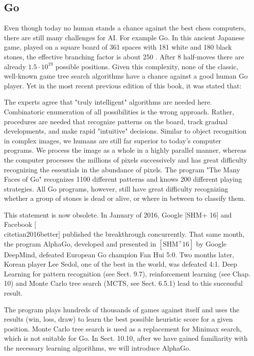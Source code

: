 \documentclass[10pt]{book}
\begin{document}
\subsection{Go}
Even though today no human stands a chance against the best chess computers, there are still many challenges for AI. For example Go. In this ancient Japanese game, played on a square board of 361 spaces with 181 white and 180 black stones, the effective branching factor is about 250 . After 8 half-moves there are already $1.5 \cdot 10^{19}$ possible positions. Given this complexity, none of the classic, well-known game tree search algorithms have a chance against a good human Go player. Yet in the most recent previous edition of this book, it was stated that:

\begin{displayquote}
The experts agree that "truly intelligent" algorithms are needed here. Combinatoric enumeration of all possibilities is the wrong approach. Rather, procedures are needed that recognize patterns on the board, track gradual developments, and make rapid "intuitive" decisions. Similar to object recognition in complex images, we humans are still far superior to today's computer programs. We process the image as a whole in a highly parallel manner, whereas the computer processes the millions of pixels successively and has great difficulty recognizing the essentials in the abundance of pixels. The program "The Many Faces of Go" recognizes 1100 different patterns and knows 200 different playing strategies. All Go programs, however, still have great difficulty recognizing whether a group of stones is dead or alive, or where in between to classify them.
\end{displayquote}

This statement is now obsolete. In January of 2016, Google [SHM+ 16] and Facebook [\\cite{tian2016better}] published the breakthrough concurrently. That same month, the program AlphaGo, developed and presented in $\left[\mathrm{SHM}^{+} 16\right]$ by Google DeepMind, defeated European Go champion Fan Hui 5:0. Two months later, Korean player Lee Sedol, one of the best in the world, was defeated 4:1. Deep Learning for pattern recognition (see Sect. 9.7), reinforcement learning (see Chap. 10) and Monte Carlo tree search (MCTS, see Sect. 6.5.1) lead to this successful result.


The program plays hundreds of thousands of games against itself and uses the results (win, loss, draw) to learn the best possible heuristic score for a given position. Monte Carlo tree search is used as a replacement for Minimax search, which is not suitable for Go. In Sect. 10.10, after we have gained familiarity with the necessary learning algorithms, we will introduce AlphaGo.
\end{document}
